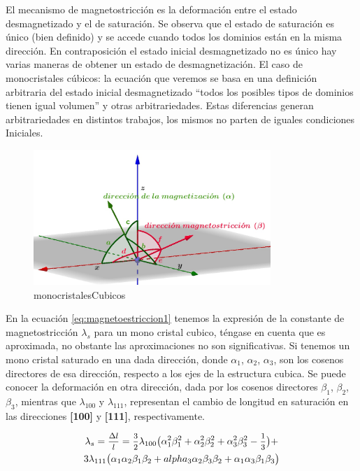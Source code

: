 El mecanismo de magnetostricción es la deformación entre el estado desmagnetizado y el de
saturación. Se observa que el estado de saturación es único (bien definido) y se accede cuando todos los dominios están en la misma dirección. En contraposición el estado inicial desmagnetizado no es único hay varias maneras de obtener un estado de desmagnetización. El caso de monocristales cúbicos: la ecuación que veremos se basa en una definición arbitraria del estado inicial desmagnetizado “todos los posibles tipos de dominios tienen igual volumen” y otras arbitrariedades. Estas diferencias generan arbitrariedades en distintos trabajos, los mismos no parten de iguales condiciones Iniciales.


\begin{figure}[H]
    \centering
    \includegraphics[width=0.8\textwidth]{./Figures/monocristalesCubicos}
	\caption{monocristalesCubicos}
	\label{fig:monocristalesCubicos}
\end{figure}


En la ecuación \ref{eq:magnetoestriccion1} tenemos la expresión de la constante de magnetostricción $\lambda_{s}$ para un mono cristal cubico, téngase en cuenta que es aproximada, no obstante las aproximaciones no son significativas. Si tenemos un mono cristal
saturado en una dada dirección, donde $\alpha_{1}$, $\alpha_{2}$, $\alpha_{3}$, son los cosenos directores de esa dirección, respecto a los ejes de la estructura cubica. Se puede conocer la deformación en otra dirección, dada por los cosenos directores $\beta_{1}$, $\beta_{2}$, $\beta_{3}$, mientras que $\lambda_{100}$ y $\lambda_{111}$, representan el cambio de longitud en saturación en las direcciones \textbf{[100]} y \textbf{[111]}, respectivamente.

\begin{multline}
	\lambda_{s}=\mfrac{\Delta l}{l}=\mfrac{3}{2}\lambda_{100}\big(\alpha_{1}^{2}\beta_{1}^{2}+
	\alpha_{2}^{2}\beta_{2}^{2}+\alpha_{3}^{2}\beta_{3}^{2}-\mfrac{1}{3} \big)+\\
	3\lambda_{111}\big(\alpha_{1}\alpha_{2}\beta_{1}\beta_{2}+
	alpha_{3}\alpha_{2}\beta_{3}\beta_{2}+\alpha_{1}\alpha_{3}\beta_{1}\beta_{3} \big)
	\label{eq:magnetoestriccion1}
\end{multline}

